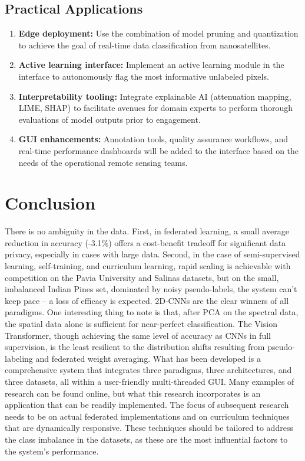 \subsection{Practical Applications}
\begin{enumerate}
    \item \textbf{Edge deployment:} Use the combination of model pruning and quantization to achieve the goal of real-time data classification from nanosatellites.

    \item \textbf{Active learning interface:} Implement an active learning module in the interface to autonomously flag the most informative unlabeled pixels.

    \item \textbf{Interpretability tooling:} Integrate explainable AI (attenuation mapping, LIME, SHAP) to facilitate avenues for domain experts to perform thorough evaluations of model outputs prior to engagement.

    \item \textbf{GUI enhancements:} Annotation tools, quality assurance workflows, and real-time performance dashboards will be added to the interface based on the needs of the operational remote sensing teams.
\end{enumerate}

\section{Conclusion}
There is no ambiguity in the data. First, in federated learning, a small average reduction in accuracy (-3.1\%) offers a cost-benefit tradeoff for significant data privacy, especially in cases with large data. Second, in the case of semi-supervised learning, self-training, and curriculum learning, rapid scaling is achievable with competition on the Pavia University and Salinas datasets, but on the small, imbalanced Indian Pines set, dominated by noisy pseudo-labels, the system can’t keep pace – a loss of efficacy is expected. 2D-CNNs are the clear winners of all paradigms. One interesting thing to note is that, after PCA on the spectral data, the spatial data alone is sufficient for near-perfect classification. The Vision Transformer, though achieving the same level of accuracy as CNNs in full supervision, is the least resilient to the distribution shifts resulting from pseudo-labeling and federated weight averaging. What has been developed is a comprehensive system that integrates three paradigms, three architectures, and three datasets, all within a user-friendly multi-threaded GUI. Many examples of research can be found online, but what this research incorporates is an application that can be readily implemented. The focus of subsequent research needs to be on actual federated implementations and on curriculum techniques that are dynamically responsive. These techniques should be tailored to address the class imbalance in the datasets, as these are the most influential factors to the system’s performance.